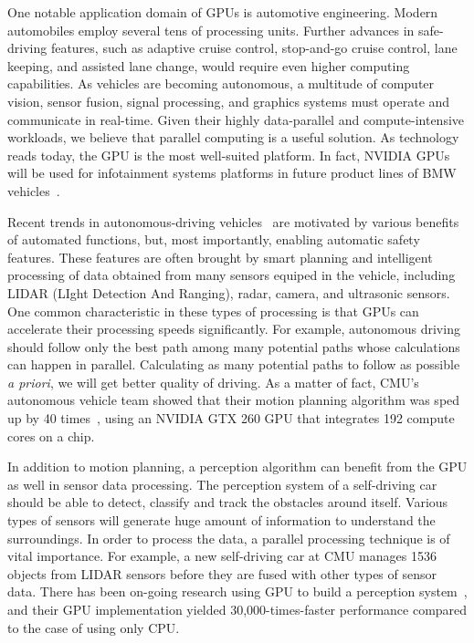 \documentclass[times, 10pt, twocolumn]{article}
\begin{document}
One notable application domain of GPUs is automotive engineering.
Modern automobiles employ several tens of processing units.
Further advances in safe-driving features, such as adaptive
cruise control, stop-and-go cruise control, lane keeping, and assisted
lane change, would require even higher computing capabilities.
As vehicles are becoming autonomous, a multitude of computer vision,
sensor fusion, signal processing, and graphics systems must operate and
communicate in real-time.
Given their highly data-parallel and compute-intensive workloads, 
we believe that parallel computing is a useful solution.
As technology reads today, the GPU is the most well-suited platform.
In fact, NVIDIA GPUs will be used for infotainment systems platforms in
future product lines of BMW vehicles~\cite{NVIDIA_BMW}.

Recent trends in autonomous-driving vehicles~\cite{Kelly12, Markoff10,
Urmson08} are motivated by various benefits of automated functions,
but, most importantly, enabling automatic safety features. 
These features are often brought by smart planning and intelligent
processing of data obtained from many sensors equiped in the vehicle,
including LIDAR (LIght Detection And Ranging), radar, camera, and
ultrasonic sensors. 
One common characteristic in these types of processing is that GPUs can
accelerate their processing speeds significantly.
For example, autonomous driving should follow only the best path among
many potential paths whose calculations can happen in parallel.
Calculating as many potential paths to follow as possible
{\it a priori}, we will get better quality of driving.
As a matter of fact, CMU's autonomous vehicle team showed that their
motion planning algorithm was sped up by 40 times~\cite{McNaughton11},
using an NVIDIA GTX 260 GPU that integrates 192 compute cores on a
chip.

In addition to motion planning, a perception algorithm can benefit
from the GPU as well in sensor data processing.
The perception system of a self-driving car should
be able to detect, classify and track the obstacles around
itself. Various types of sensors will generate huge amount of
information to understand the surroundings. In order to process the
data, a parallel processing technique is of vital importance. For
example, a new self-driving car at CMU manages 1536 objects from LIDAR
sensors before they are fused with other types of sensor data. There has
been on-going research using GPU to build a perception
system~\cite{Ferreira11}, and their GPU implementation yielded
30,000-times-faster performance compared to the case of using only CPU. 
\end{document}
